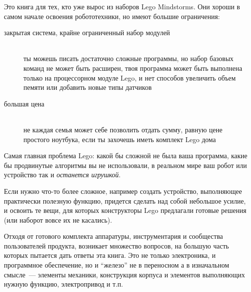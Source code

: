 \secdown

\noindent
Это книга для тех, кто уже вырос из наборов Lego Mindstorms.
Они хороши в самом начале освоения робототехники, но имеют большие
ограничения:

\begin{description}

\item[закрытая система, крайне ограниченный набор модулей]\ \\ты можешь писать
достаточно сложные программы, но набор базовых команд не может быть расширен,
твоя программа может быть выполнена только на процессорном модуле Lego, и нет
способов увеличить объем пемяти или добавить новые типы датчиков

\item[большая цена]\ \\не каждая семья может себе позволить отдать сумму,
равную цене простого ноутбука, если ты захочешь иметь комплект Lego дома

\end{description}
\clearpage

Самая главная проблема Lego: какой бы сложной не была ваша программа, какие бы
продвинутые алгоритмы вы не использовали, в реальном мире ваш робот или
устройство так и \textit{останется игрушкой}.

Если нужно что-то более сложное, например создать устройство, выполняющее
практически полезную функцию, придется сделать над собой небольшое усилие, и
освоить те вещи, для которых конструкторы Lego предлагали готовые решения (или
наборот вовсе их не касались).

Отходя от готового комплекта аппаратуры, инструментария и сообщества
пользователей продукта, возникает множество вопросов, на большую часть которых
пытается дать ответы эта книга. Это не только электроника, и программное
обеспечение, но и ``железо'' не в переносном а в изначальном смысле\ ---
элементы механики, конструкция корпуса и элементов выполняющих нужную функцию,
электропривод и т.п. 

\secup
